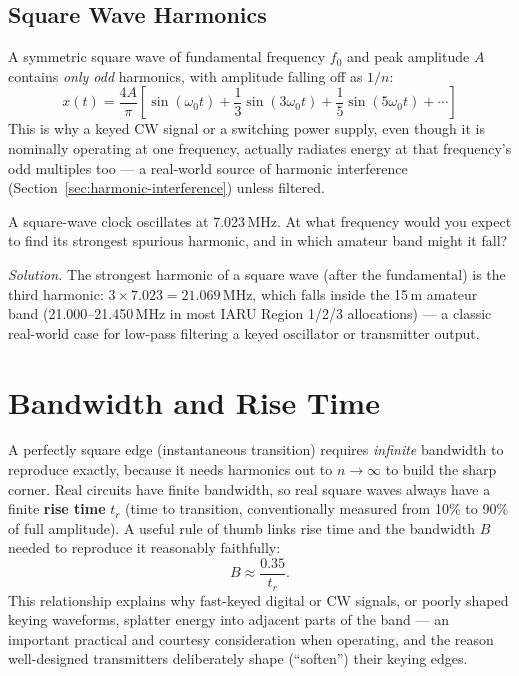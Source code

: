 \subsection{Square Wave Harmonics}

A symmetric square wave of fundamental frequency $f_0$ and peak amplitude
$A$ contains \emph{only odd} harmonics, with amplitude falling off as
$1/n$:
\[
x(t) = \frac{4A}{\pi}\left[\sin(\omega_0 t) + \frac{1}{3}\sin(3\omega_0 t) + \frac{1}{5}\sin(5\omega_0 t) + \cdots\right]
\]
This is why a keyed CW signal or a switching power supply, even though it
is nominally operating at one frequency, actually radiates energy at that
frequency's odd multiples too --- a real-world source of harmonic
interference (Section~\ref{sec:harmonic-interference}) unless filtered.

\begin{examplebox}
A square-wave clock oscillates at 7.023\,MHz. At what frequency would you
expect to find its strongest spurious harmonic, and in which amateur band
might it fall?

\emph{Solution.} The strongest harmonic of a square wave (after the
fundamental) is the third harmonic: $3 \times 7.023 = 21.069\,\text{MHz}$,
which falls inside the 15\,m amateur band (21.000--21.450\,MHz in most
IARU Region 1/2/3 allocations) --- a classic real-world case for
low-pass filtering a keyed oscillator or transmitter output.
\end{examplebox}

\section{Bandwidth and Rise Time}

A perfectly square edge (instantaneous transition) requires
\emph{infinite} bandwidth to reproduce exactly, because it needs
harmonics out to $n \to \infty$ to build the sharp corner. Real circuits
have finite bandwidth, so real square waves always have a finite
\textbf{rise time} $t_r$ (time to transition, conventionally measured
from 10\% to 90\% of full amplitude). A useful rule of thumb links rise
time and the bandwidth $B$ needed to reproduce it reasonably faithfully:
\[
B \approx \frac{0.35}{t_r}.
\]
This relationship explains why fast-keyed digital or CW signals, or
poorly shaped keying waveforms, splatter energy into adjacent parts of
the band --- an important practical and courtesy consideration when
operating, and the reason well-designed transmitters deliberately shape
(``soften'') their keying edges.

